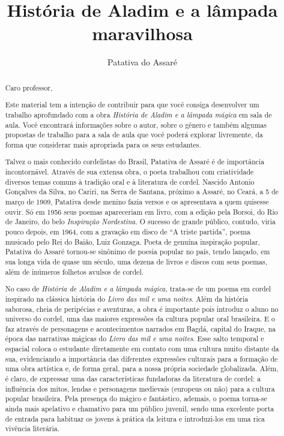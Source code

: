 \documentclass[11pt]{extarticle}
\newcommand{\AutorLivro}{Patativa do Assaré}
\newcommand{\TituloLivro}{História de Aladim e a lâmpada maravilhosa}
\newcommand{\colaborador}{Paulo Pompermaier}
\begin{document}
\title{\TituloLivro}
\author{\AutorLivro}
\def\authornotes{\colaborador}

\date{}
\maketitle

\tableofcontents


\begin{abstract}

Caro professor,

Este material tem a intenção de contribuir para que você consiga desenvolver um trabalho aprofundado com a obra \textit{História de Aladim e a lâmpada mágica} em sala de aula.
Você encontrará informações sobre o autor, sobre o gênero e também 
algumas propostas de trabalho para a sala de aula que você poderá explorar livremente, 
da forma que considerar mais apropriada para os seus estudantes.

Talvez o mais conhecido cordelistas do Brasil, Patativa de Assaré é de importância incontornável. Através de sua extensa obra, o poeta trabalhou com criatividade diversos temas comuns à tradição oral e à literatura de cordel.
Nascido Antonio Gonçalves da Silva, no Cariri, na Serra de Santana, próximo a Assaré,
no Ceará, a 5 de março de 1909, Patativa 
desde menino fazia versos e os apresentava a
quem quisesse ouvir. Só em 1956 seus poemas apareceriam em livro, com a edição
pela Borsoi, do Rio de Janeiro, do belo \textit{Inspiração Nordestina}. O
sucesso de grande público, contudo, viria pouco depois, em 1964, com a gravação
em disco de ``A triste partida'', poema musicado pelo Rei do Baião, Luiz
Gonzaga. Poeta de genuína inspiração popular, Patativa do Assaré tornou-se
sinônimo de poesia popular no país, tendo lançado, em sua longa vida de quase
um século, uma dezena de livros e discos com seus poemas, além de inúmeros
folhetos avulsos de cordel. 

No caso de \textit{História de Aladim e a lâmpada mágica}, trata-se de um poema em cordel inspirado na clássica história do \textit{Livro das mil e uma noites}.
Além da história saborosa, cheia de peripécias e aventuras, a obra é importante pois introduz o aluno no universo do cordel, uma das maiores expressões da cultura popular oral brasileira. E o faz através de personagens e acontecimentos narrados em Bagdá, capital do Iraque, na época das narrativas mágicas do \textit{Livro das mil e uma noites}. Esse salto temporal e espacial coloca o estudante diretamente em contato com uma cultura muito distante da sua, evidenciando a importância das diferentes expressões culturais para a formação de uma obra artística e, de forma geral, para a nossa própria sociedade globalizada. Além, é claro, de expressar uma das características fundadoras da literatura de cordel: a influência dos mitos, lendas e personagens medievais (europeus ou não) para a cultura popular brasileira. 
Pela presença do mágico e fantástico, ademais, o poema torna-se ainda mais apelativo e chamativo para um público juvenil, sendo uma excelente porta de entrada para habituar os jovens à prática da leitura e introduzi-los em uma rica vivência literária.


\end{abstract}
\end{document}
